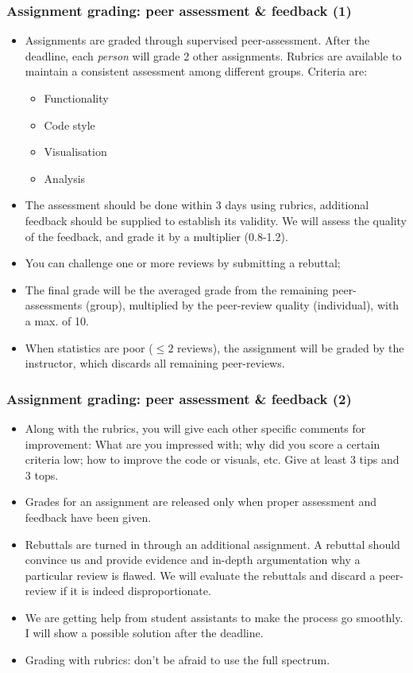 \begin{frame}
\frametitle{Assignment grading: peer assessment \& feedback (1)}
\begin{itemize}
  \item Assignments are graded through supervised peer-assessment. After the deadline, each \emph{person} will grade 2 other assignments. Rubrics are available to maintain a consistent assessment among different groups. Criteria are:
    \begin{itemize}
      \item Functionality
      \item Code style
      \item Visualisation
      \item Analysis
    \end{itemize}
  \item The assessment should be done within 3 days using rubrics, additional feedback should be supplied to establish its validity. We will assess the quality of the feedback, and grade it by a multiplier (0.8-1.2).
  \item You can challenge one or more reviews by submitting a rebuttal; 

  \item The final grade will be the averaged grade from the remaining peer-assessments (group), multiplied by the peer-review quality (individual), with a max. of 10.
  \item When statistics are poor ($\leq 2$ reviews), the assignment will be graded by the instructor, which discards all remaining peer-reviews.
\end{itemize}
\end{frame}

\begin{frame}
\frametitle{Assignment grading: peer assessment \& feedback (2)}
\begin{itemize}
    \item Along with the rubrics, you will give each other specific comments for improvement: What are you impressed with; why did you score a certain criteria low; how to improve the code or  visuals, etc. Give at least 3 tips and 3 tops.
    \item Grades for an assignment are released only when proper assessment and feedback have been given.
    \item Rebuttals are turned in through an additional assignment. A rebuttal should convince us and provide evidence and in-depth argumentation why a particular review is flawed. We will evaluate the rebuttals and discard a peer-review if it is indeed disproportionate.
    \item We are getting help from student assistants to make the process go smoothly. I will show a possible solution after the deadline.
    \item Grading with rubrics: don't be afraid to use the full spectrum.
\end{itemize}

\end{frame}

